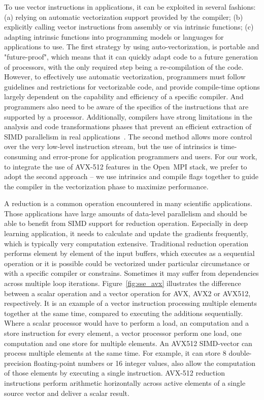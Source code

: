 \documentclass[sigconf]{acmart}
\newcommand{\ompi}[0]{Open~MPI\xspace}
\begin{document}
To use vector instructions in applications, it can be exploited in several fashions: 
(a) relying on automatic vectorization support provided by the compiler;
(b) explicitly calling vector instructions from assembly or via intrinsic functions;
(c) adapting intrinsic functions into programming models or languages
for applications to use.
%
The first strategy by using auto-vectorization, is portable and
"future-proof", which means that it can quickly adapt code to a future
generation of processors, with the only required step being a
re-compilation of the code. However, to effectively use automatic
vectorization, programmers must follow guidelines and restrictions for
vectorizable code, and provide compile-time options largely dependent
on the capability and efficiency of a specific compiler.
%
And programmers also need to be aware of the specifics of the
instructions that are supported by a processor.  Additionally,
compilers have strong limitations in the analysis and code
transformations phases that prevent an efficient extraction of SIMD
parallelism in real applications~\cite{auto_Evaluation}.
%
The second method allows more control over the very low-level
instruction stream, but the use of intrinsics is time-consuming and
error-prone for application programmers and users.
%
For our work, to integrate the use of AVX-512 features in the \ompi
stack, we prefer to adopt the second approach -- we use intrinsics and
compile flags together to guide the compiler in the vectorization
phase to maximize performance.

A reduction is a common operation encountered in many scientific applications.
Those applications have large amounts of data-level parallelism and should be able
to benefit from SIMD support for reduction operation. Especially in deep learning application,
it needs to calculate and update the gradients frequently, which is typically very computation extensive.
Traditional reduction operation performs element by element of the input buffers,
which executes as a sequential operation or it is possible could be vectorized
under particular circumstance or with a specific compiler or constrains. Sometimes
it may suffer from dependencies across multiple loop iterations.
%
Figure~\ref{fig:sse_avx} illustrates the difference between a scalar operation and
a vector operation for AVX, AVX2 or AVX512, respectively.
%
It is an example of a vector instruction processing multiple elements together at the same time,
compared to executing the additions sequentially. Where a scalar processor would have to perform a load, an
computation and a store instruction for every element, a vector processor perform one load, one computation and
one store for multiple elements.
An AVX512 SIMD-vector can process multiple elements at
the same time. For example, it can store 8 double-precision floating-point numbers or 16 integer values, also allow the computation of those elements by executing a single instruction.
AVX-512 reduction instructions perform arithmetic horizontally across active elements of a
single source vector and deliver a scalar result.
\end{document}
